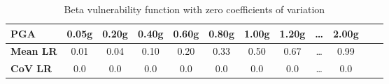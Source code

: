 \begin{table}[htbp]

\centering
\begin{tabular}{ l c c c c c c c c c c c}

\hline
\rowcolor{anti-flashwhite}
\bf{PGA} & \bf{0.05g} & \bf{0.20g} & \bf{0.40g} & \bf{0.60g} & \bf{0.80g} & \bf{1.00g} & \bf{1.20g} & \bf{\dots} & \bf{2.00g} \\
\hline
\bf{Mean LR} & 0.01 & 0.04 & 0.10 & 0.20 & 0.33 & 0.50 & 0.67 & \dots & 0.99 \\
\bf{CoV LR} & 0.0 & 0.0 & 0.0 & 0.0 & 0.0 & 0.0 & 0.0 & \dots & 0.0 \\
\hline
\end{tabular}

\caption{Beta vulnerability function with zero coefficients of variation}
\label{tab:vf-bt-tax1-zcov}
\end{table}